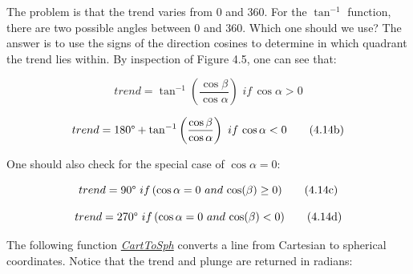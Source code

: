 \documentclass[a4paper , 12pt]{book}
\begin{document}
The problem is that the trend varies from 0 and 360\degree. For the $\tan^{-1}$ function, there are two possible angles between 0 and 360\degree. Which one should we use? The answer is to use the signs of the direction cosines to determine in which quadrant the trend lies within. By inspection of Figure 4.5, one can see that:

\begin{equation}
    trend = \tan^{-1}\left(\frac{\cos\beta}{\cos\alpha}\right)\,\,if\,\cos\alpha>0 \tag{4.14a}
\end{equation}

\begin{equation}
    trend = 180\degree+\tan^{-1}\left(\frac{\cos\beta}{\cos\alpha}\right)\,\,if\,\cos\alpha<0 \tag{4.14b}
\end{equation}

One should also check for the special case of $\cos\alpha=0$:

\begin{equation}
    trend = 90\degree\,\,if\,(\cos\alpha = 0\,\,and\,\cos(\beta)\geq 0) \tag{4.14c}
\end{equation}

\begin{equation}
    trend = 270\degree\,\,if\,(\cos\alpha = 0\,\,and\,\cos(\beta)< 0) \tag{4.14d}
\end{equation}

The following function \href{https://github.com/nfcd/compGeo/blob/master/source/functions/CartToSph.py}{\textit{CartToSph}} converts a line from Cartesian to spherical coordinates. Notice that the trend and plunge are returned in radians:
\end{document}
